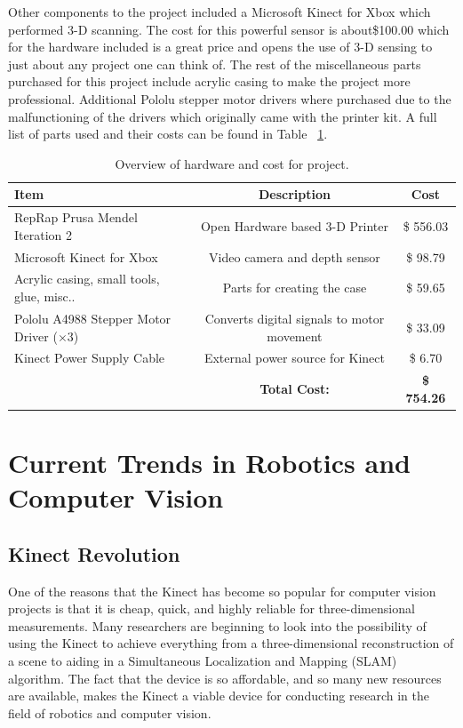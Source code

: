 \documentclass[pdftex,10.5pt]{report}
\begin{document}
Other components to the project included a Microsoft Kinect for Xbox which performed 3-D scanning. The cost for this powerful sensor is about\$100.00 which for the hardware included is a great price and opens the use of 3-D sensing to just about any project one can think of. The rest of the miscellaneous parts purchased for this project include acrylic casing to make the project more professional. Additional Pololu stepper motor drivers where purchased due to the malfunctioning of the drivers which originally came with the printer kit. A full list of parts used and their costs can be found in Table ~\ref{tab:costs}.

\begin{table}[H]
	\centering
 	\begin{tabular}{|l|c|c|}
		\hline
		\textbf{Item} & \textbf{Description} & \textbf{Cost} \\
		\hline
 		RepRap Prusa Mendel Iteration 2 & Open Hardware based 3-D Printer& \$ 556.03\\
		Microsoft Kinect for Xbox & Video camera and depth sensor & \$ 98.79 \\
		Acrylic casing, small tools, glue, misc.. & Parts for creating the case & \$ 59.65 \\
		Pololu A4988 Stepper Motor Driver ($\times 3$)   & Converts digital signals to motor movement & \$ 33.09 \\
		Kinect Power Supply Cable & External power source for Kinect & \$ 6.70 \\
		\hline
		& \textbf{Total Cost:} & \textbf{\$  754.26} \\
		\hline
	\end{tabular}
	\caption{
	Overview of hardware and cost for project.
	}	
\label{tab:costs}
\end{table}

\section{Current Trends in Robotics and Computer Vision}

\subsection{Kinect Revolution}
One of the reasons that the Kinect has become so popular for computer vision projects is that it is cheap, quick, and highly reliable for three-dimensional measurements. Many researchers are beginning to look into the possibility of using the Kinect to achieve everything from a three-dimensional reconstruction of a scene to aiding in a Simultaneous Localization and Mapping (SLAM) algorithm. The fact that the device is so affordable, and so many new resources are available, makes the Kinect a viable device for conducting research in the field of robotics and computer vision.
\end{document}
